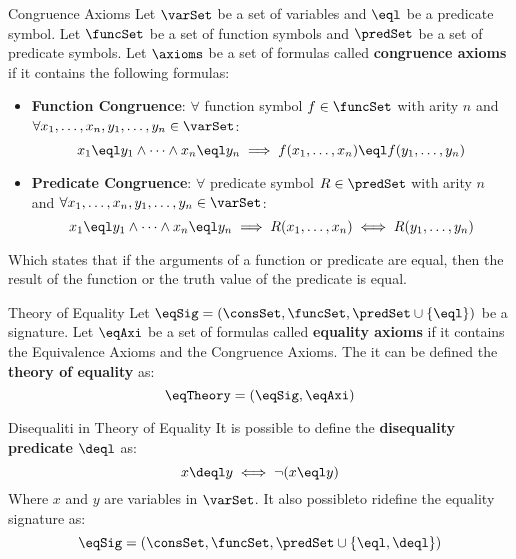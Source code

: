 \begin{definition}{Congruence Axioms}
    Let $\varSet$ be a set of variables and $\eql$ be a predicate symbol.
    Let $\funcSet$ be a set of function symbols and $\predSet$ be a set of predicate symbols.
    Let $\axioms$ be a set of formulas called \textbf{congruence axioms} if
    it contains the following formulas:
    \begin{itemize}
        \item \textbf{Function Congruence}: 
        $\forall$ function symbol $f \in \funcSet$ with arity $n$ and
        $\forall x_1,\dots,x_n,y_1,\dots,y_n \in \varSet$:
        \begin{equation*}
            x_1 \eql y_1 \land \dots \land x_n \eql y_n 
            \implies f(x_1,\dots,x_n) \eql f(y_1,\dots,y_n)
        \end{equation*}
        \item \textbf{Predicate Congruence}:
        $\forall$ predicate symbol $R \in \predSet$ with arity $n$ and
        $\forall x_1,\dots,x_n,y_1,\dots,y_n \in \varSet$:
        \begin{equation*}
            x_1 \eql y_1 \land \dots \land x_n \eql y_n 
            \implies R(x_1,\dots,x_n) \iff R(y_1,\dots,y_n)
        \end{equation*}
    \end{itemize}
    Which states that if the arguments of a function or predicate are equal, 
    then the result of the function or the truth value of the predicate is equal.
\end{definition}

\begin{definition}{Theory of Equality}
    Let $\eqSig = (\consSet,\funcSet,\predSet \cup \{\eql\})$ be a signature.
    Let $\eqAxi$ be a set of formulas called \textbf{equality axioms} 
    if it contains the Equivalence Axioms and the Congruence Axioms.
    The it can be defined the \textbf{theory of equality} as:
    \begin{equation*}
        \eqTheory = (\eqSig,\eqAxi)
    \end{equation*}
\end{definition}

\begin{notation}{Disequaliti in Theory of Equality}
    It is possible to define the \textbf{disequality predicate} $\deql$ as:
    \begin{equation*}
        x \deql y \iff \neg (x \eql y)
    \end{equation*}
    Where $x$ and $y$ are variables in $\varSet$.
    It also possibleto ridefine the equality signature as:
    \begin{equation*}
        \eqSig = (\consSet,\funcSet,\predSet \cup \{\eql,\deql\})
    \end{equation*}
\end{notation}

